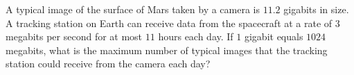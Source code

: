A typical image of the surface of Mars taken by a camera is $11.2$ gigabits in size. A tracking station on Earth can receive data from the spacecraft at a rate of $3$ megabits per second for at most $11$ hours each day. If $1$ gigabit equals $1024$ megabits, what is the maximum number of typical images that the tracking station could receive from the camera each day?
